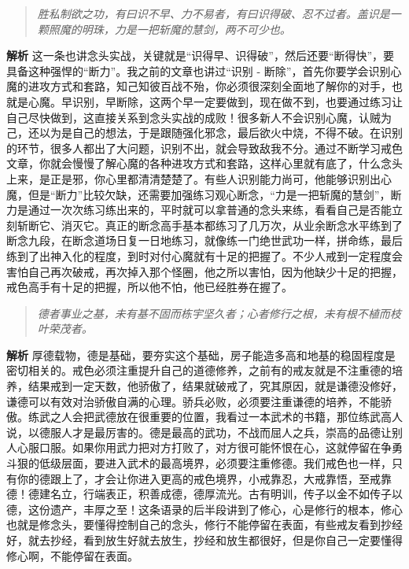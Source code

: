 \begin{quote}\it
    胜私制欲之功，有曰识不早、力不易者，有曰识得破、忍不过者。盖识是一颗照魔的明珠，力是一把斩魔的慧剑，两不可少也。
\end{quote}

\textbf{解析} 这一条也讲念头实战，关键就是“识得早、识得破”，然后还要“断得快”，要具备这种强悍的“断力”。我之前的文章也讲过“识别 - 断除”，首先你要学会识别心魔的进攻方式和套路，知己知彼百战不殆，你必须很深刻全面地了解你的对手，也就是心魔。早识别，早断除，这两个早一定要做到，现在做不到，也要通过练习让自己尽快做到，这直接关系到念头实战的成败！很多新人不会识别心魔，认贼为己，还以为是自己的想法，于是跟随强化邪念，最后欲火中烧，不得不破。在识别的环节，很多人都出了大问题，识别不出，就会导致敌我不分。通过不断学习戒色文章，你就会慢慢了解心魔的各种进攻方式和套路，这样心里就有底了，什么念头上来，是正是邪，你心里都清清楚楚了。有些人识别能力尚可，他能够识别出心魔，但是“断力”比较欠缺，还需要加强练习观心断念，“力是一把斩魔的慧剑”，断力是通过一次次练习练出来的，平时就可以拿普通的念头来练，看看自己是否能立刻斩断它、消灭它。真正的断念高手基本都练习了几万次，从业余断念水平练到了断念九段，在断念道场日复一日地练习，就像练一门绝世武功一样，拼命练，最后练到了出神入化的程度，到时对付心魔就有十足的把握了。不少人戒到一定程度会害怕自己再次破戒，再次掉入那个怪圈，他之所以害怕，因为他缺少十足的把握，戒色高手有十足的把握，所以他不怕，他已经胜券在握了。

\begin{quote}\it
    德者事业之基，未有基不固而栋宇坚久者；心者修行之根，未有根不植而枝叶荣茂者。
\end{quote}

\textbf{解析} 厚德载物，德是基础，要夯实这个基础，房子能造多高和地基的稳固程度是密切相关的。戒色必须注重提升自己的道德修养，之前有的戒友就是不注重德的培养，结果戒到一定天数，他骄傲了，结果就破戒了，究其原因，就是谦德没修好，谦德可以有效对治骄傲自满的心理。骄兵必败，必须要注重谦德的培养，不能骄傲。练武之人会把武德放在很重要的位置，我看过一本武术的书籍，那位练武高人说，以德服人才是最厉害的。德是最高的武功，不战而屈人之兵，崇高的品德让别人心服口服。如果你用武力把对方打败了，对方很可能怀恨在心，这就停留在争勇斗狠的低级层面，要进入武术的最高境界，必须要注重修德。我们戒色也一样，只有你的德跟上了，才会让你进入更高的戒色境界，小戒靠忍，大戒靠悟，至戒靠德！德建名立，行端表正，积善成德，德厚流光。古有明训，传子以金不如传子以德，这份遗产，丰厚之至！这条语录的后半段讲到了修心，心是修行的根本，修心也就是修念头，要懂得控制自己的念头，修行不能停留在表面，有些戒友看到抄经好，就去抄经，看到放生好就去放生，抄经和放生都很好，但是你自己一定要懂得修心啊，不能停留在表面。

